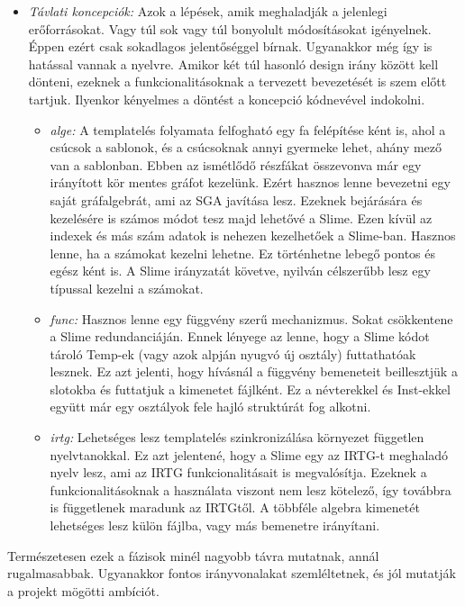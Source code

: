 {\begin{itemize}
\item \emph{Távlati koncepciók:}
Azok a lépések, amik meghaladják a jelenlegi erőforrásokat.
Vagy túl sok vagy túl bonyolult módosításokat igényelnek.
Éppen ezért csak sokadlagos jelentőséggel bírnak.
Ugyanakkor még így is hatással vannak a nyelvre.
Amikor két túl hasonló design irány között kell dönteni, ezeknek a funkcionalitásoknak a tervezett bevezetését is szem előtt tartjuk.
Ilyenkor kényelmes a döntést a koncepció kódnevével indokolni.
\begin{itemize}
\item \emph{alge:}
A templatelés folyamata felfogható egy fa felépítése ként is, ahol a csúcsok a sablonok, és a csúcsoknak annyi gyermeke lehet, ahány mező van a sablonban.
Ebben az ismétlődő részfákat összevonva már egy irányított kör mentes gráfot kezelünk.
Ezért hasznos lenne bevezetni egy saját gráfalgebrát, ami az SGA javítása lesz.
Ezeknek bejárására és kezelésére is számos módot tesz majd lehetővé a Slime.
Ezen kívül az indexek és más szám adatok is nehezen kezelhetőek a Slime-ban.
Hasznos lenne, ha a számokat kezelni lehetne.
Ez történhetne lebegő pontos és egész ként is.
A Slime irányzatát követve, nyilván célszerűbb lesz egy típussal kezelni a számokat. 
\item \emph{func:}
Hasznos lenne egy függvény szerű mechanizmus.
Sokat csökkentene a Slime redundanciáján.
Ennek lényege az lenne, hogy a Slime kódot tároló Temp-ek (vagy azok alpján nyugvó új osztály) futtathatóak lesznek.
Ez azt jelenti, hogy hívásnál a függvény bemeneteit beillesztjük a slotokba és futtatjuk a kimenetet fájlként.
Ez a névterekkel és Inst-ekkel együtt már egy osztályok fele hajló struktúrát fog alkotni.
\item \emph{irtg:}
Lehetséges lesz templatelés szinkronizálása környezet független nyelvtanokkal.
Ez azt jelentené, hogy a Slime egy az IRTG-t meghaladó nyelv lesz, ami az IRTG funkcionalitásait is megvalósítja.
Ezeknek a funkcionalitásoknak a használata viszont nem lesz kötelező, így továbbra is függetlenek maradunk az IRTGtől.
A többféle algebra kimenetét lehetséges lesz külön fájlba, vagy más bemenetre irányítani.
\end{itemize}

\end{itemize}

Természetesen ezek a fázisok minél nagyobb távra mutatnak, annál rugalmasabbak.
Ugyanakkor fontos irányvonalakat szemléltetnek, és jól mutatják a projekt mögötti ambíciót.



}
